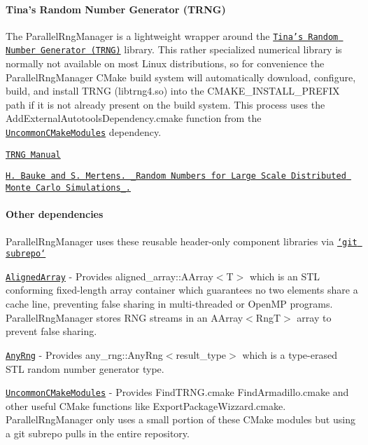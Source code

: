 \paragraph*{Tina's Random Number Generator (T\-R\-N\-G)}

The Parallel\-Rng\-Manager is a lightweight wrapper around the \href{https://www.numbercrunch.de/trng/}{\tt Tina's Random Number Generator (T\-R\-N\-G)} library. This rather specialized numerical library is normally not available on most Linux distributions, so for convenience the Parallel\-Rng\-Manager C\-Make build system will automatically download, configure, build, and install T\-R\-N\-G ({\ttfamily libtrng4.\-so}) into the {\ttfamily C\-M\-A\-K\-E\-\_\-\-I\-N\-S\-T\-A\-L\-L\-\_\-\-P\-R\-E\-F\-I\-X} path if it is not already present on the build system. This process uses the {\ttfamily Add\-External\-Autotools\-Dependency.\-cmake} function from the \href{https://github.com/markjolah/UncommonCMakeModules}{\tt Uncommon\-C\-Make\-Modules} dependency.


\begin{DoxyItemize}
\item \href{https://www.numbercrunch.de/trng/trng.pdf}{\tt T\-R\-N\-G Manual}
\item \href{http://arxiv.org/abs/cond-mat/0609584}{\tt H. Bauke and S. Mertens. \-\_\-\-Random Numbers for Large Scale Distributed Monte Carlo Simulations\-\_\-.}
\end{DoxyItemize}

\paragraph*{Other dependencies}

Parallel\-Rng\-Manager uses these reusable header-\/only component libraries via \href{https://github.com/ingydotnet/git-subrepo}{\tt `git subrepo`}
\begin{DoxyItemize}
\item \href{https://github.com/markjolah/AlignedArray}{\tt Aligned\-Array} -\/ Provides {\ttfamily aligned\-\_\-array\-::\-A\-Array$<$T$>$} which is an S\-T\-L conforming fixed-\/length array container which guarantees no two elements share a cache line, preventing false sharing in multi-\/threaded or Open\-M\-P programs. Parallel\-Rng\-Manager stores R\-N\-G streams in an {\ttfamily A\-Array$<$Rng\-T$>$} array to prevent false sharing.
\item \href{https://github.com/markjolah/AnyRng}{\tt Any\-Rng} -\/ Provides {\ttfamily any\-\_\-rng\-::\-Any\-Rng$<$result\-\_\-type$>$} which is a type-\/erased S\-T\-L random number generator type.
\item \href{https://github.com/markjolah/UncommonCMakeModules}{\tt Uncommon\-C\-Make\-Modules} -\/ Provides {\ttfamily Find\-T\-R\-N\-G.\-cmake} {\ttfamily Find\-Armadillo.\-cmake} and other useful C\-Make functions like {\ttfamily Export\-Package\-Wizzard.\-cmake}. Parallel\-Rng\-Manager only uses a small portion of these C\-Make modules but using a {\ttfamily git subrepo} pulls in the entire repository.
\end{DoxyItemize}

